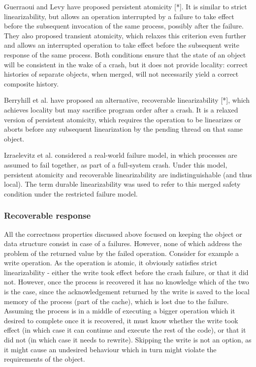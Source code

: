 \documentclass{article}
\begin{document}
Guerraoui and Levy have proposed persistent atomicity [*]. It is similar to strict linearizability, but allows an operation interrupted by a failure to take effect before the subsequent invocation of the same process, possibly after the failure. They also proposed transient atomicity, which relaxes this criterion even further and allows an interrupted operation to take effect before the subsequent write response of the same process. Both conditions ensure that the state of an object will be consistent in the wake of a crash, but it does not provide locality: correct histories of separate objects, when merged, will not necessarily yield a correct composite history.

Berryhill et al. have proposed an alternative, recoverable linearizability [*], which achieves locality but may sacrifice program order after a crash. It is a relaxed version of persistent atomicity, which requires the operation to be linearizes or aborts before any subsequent linearization by the pending thread on that same object.

Izraelevitz et al. considered a real-world failure model, in which processes are assumed to fail together, as part of a full-system crash. Under this model, persistent atomicity and recoverable linearizability are indistinguishable (and thus local). The term durable linearizability was used to refer to this merged safety condition under the restricted failure model.

\subsubsection{Recoverable response}
All the correctness properties discussed above focused on keeping the object or data structure consist in case of a failures. However, none of which address the problem of the returned value by the failed operation. Consider for example a write operation. As the operation is atomic, it obviously satisfies strict linearizability - either the write took effect before the crash failure, or that it did not. However, once the process is recovered it has no knowledge which of the two is the case, since the acknowledgement returned by the write is saved to the local memory of the process (part of the cache), which is lost due to the failure. Assuming the process is in a middle of executing a bigger operation which it desired to complete once it is recovered, it must know whether the write took effect (in which case it can continue and execute the rest of the code), or that it did not (in which case it needs to rewrite). Skipping the write is not an option, as it might cause an undesired behaviour which in turn might violate the requirements of the object.
\end{document}
